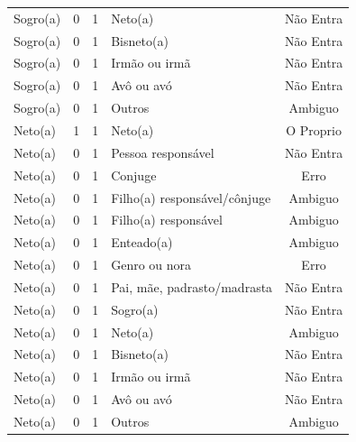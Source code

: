 \documentclass[
	12pt,				%
	openright,			%
	twoside,			%
	a4paper,			%
	english,			%
	french,				%
	spanish,			%
	brazil				%
	]{abntex2}
\begin{document}
\begin{anexosenv}
\begin{longtable}{@{}lcclc@{}}
Sogro(a)                     & 0         & 1        & Neto(a)                      & Não Entra       \\
Sogro(a)                     & 0         & 1        & Bisneto(a)                   & Não Entra       \\
Sogro(a)                     & 0         & 1        & Irmão ou irmã                & Não Entra       \\
Sogro(a)                     & 0         & 1        & Avô ou avó                   & Não Entra       \\
Sogro(a)                     & 0         & 1        & Outros                       & Ambiguo         \\
Neto(a)                      & 1         & 1        & Neto(a)                      & O Proprio       \\
Neto(a)                      & 0         & 1        & Pessoa responsável           & Não Entra       \\
Neto(a)                      & 0         & 1        & Conjuge                      & Erro            \\
Neto(a)                      & 0         & 1        & Filho(a) responsável/cônjuge & Ambiguo         \\
Neto(a)                      & 0         & 1        & Filho(a) responsável         & Ambiguo         \\
Neto(a)                      & 0         & 1        & Enteado(a)                   & Ambiguo         \\
Neto(a)                      & 0         & 1        & Genro ou nora                & Erro            \\
Neto(a)                      & 0         & 1        & Pai, mãe, padrasto/madrasta  & Não Entra       \\
Neto(a)                      & 0         & 1        & Sogro(a)                     & Não Entra       \\
Neto(a)                      & 0         & 1        & Neto(a)                      & Ambiguo         \\
Neto(a)                      & 0         & 1        & Bisneto(a)                   & Não Entra       \\
Neto(a)                      & 0         & 1        & Irmão ou irmã                & Não Entra       \\
Neto(a)                      & 0         & 1        & Avô ou avó                   & Não Entra       \\
Neto(a)                      & 0         & 1        & Outros                       & Ambiguo         \\

\end{longtable}
\end{anexosenv}
\end{document}
